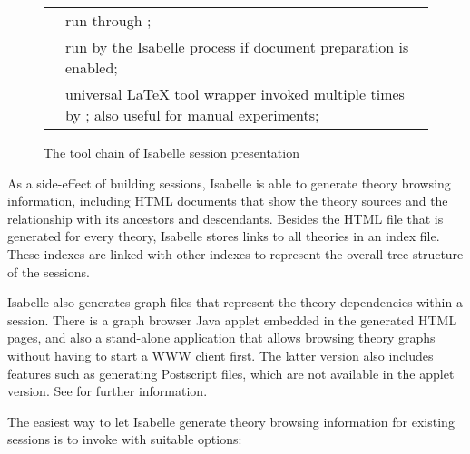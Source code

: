 \begin{isabellebody}
\begin{isamarkuptext}
\begin{figure}[htbp]
\begin{center}
\begin{tabular}{lp{}}
      \hyperlink{executable.isabelle-process}{\mbox{\isa{\isatt{isabelle{\isaliteral{2D}{\isacharminus}}process}}}} & run through \indexref{}{tool}{build}\hyperlink{tool.build}{\mbox{\isa{\isatool{build}}}}; \\

      \indexref{}{tool}{document}\hyperlink{tool.document}{\mbox{\isa{\isatool{document}}}} & run by the Isabelle process if document
      preparation is enabled; \\

      \indexref{}{tool}{latex}\hyperlink{tool.latex}{\mbox{\isa{\isatool{latex}}}} & universal {\LaTeX} tool wrapper invoked
      multiple times by \indexref{}{tool}{document}\hyperlink{tool.document}{\mbox{\isa{\isatool{document}}}}; also useful for manual
      experiments; \\

  \end{tabular}
  \caption{The tool chain of Isabelle session presentation} \label{fig:session-tools}
  \end{center}
  \end{figure}%
\end{isamarkuptext}%
\isamarkuptrue%
%
\isamarkuptrue%
%
\begin{isamarkuptext}%

  As a side-effect of building sessions, Isabelle is able to generate
  theory browsing information, including HTML documents that show the
  theory sources and the relationship with its ancestors and
  descendants.  Besides the HTML file that is generated for every
  theory, Isabelle stores links to all theories in an index
  file. These indexes are linked with other indexes to represent the
  overall tree structure of the sessions.

  Isabelle also generates graph files that represent the theory
  dependencies within a session.  There is a graph browser Java applet
  embedded in the generated HTML pages, and also a stand-alone
  application that allows browsing theory graphs without having to
  start a WWW client first.  The latter version also includes features
  such as generating Postscript files, which are not available in the
  applet version.  See  for further information.

  \medskip

  The easiest way to let Isabelle generate theory browsing information
  for existing sessions is to invoke \hyperlink{tool.build}{\mbox{}} with suitable
  options:


\end{isamarkuptext}
\end{isabellebody}
